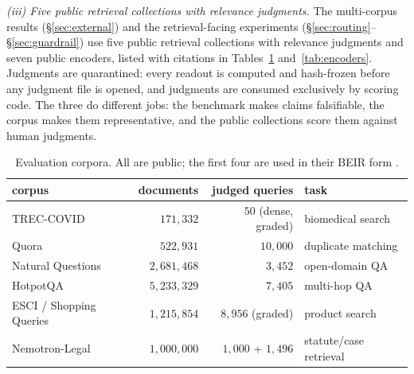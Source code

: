\documentclass[11pt,letterpaper]{article}
\begin{document}
\emph{(iii) Five public retrieval collections with relevance
judgments.} The multi-corpus results (\S\ref{sec:external}) and the
retrieval-facing experiments
(\S\ref{sec:routing}--\S\ref{sec:guardrail}) use five public retrieval
collections with relevance judgments and seven public encoders, listed
with citations in Tables~\ref{tab:corpora} and~\ref{tab:encoders}.
Judgments are quarantined: every readout is computed and hash-frozen
before any judgment file is opened, and judgments are consumed exclusively
by scoring code. The three do different jobs: the benchmark makes claims falsifiable,
the corpus makes them representative, and the public collections score
them against human judgments.

\begin{table}[t]
\centering
\caption{Evaluation corpora. All are public; the first four are used in
their BEIR form \cite{thakur2021}.}
\label{tab:corpora}
\small
\begin{tabular}{lrrl}
\toprule
corpus & documents & judged queries & task\\
\midrule
TREC-COVID \cite{voorhees2020} & $171{,}332$ & $50$ (dense, graded) & biomedical search\\
Quora \cite{iyer2017} & $522{,}931$ & $10{,}000$ & duplicate matching\\
Natural Questions \cite{kwiatkowski2019} & $2{,}681{,}468$ & $3{,}452$ & open-domain QA\\
HotpotQA \cite{yang2018} & $5{,}233{,}329$ & $7{,}405$ & multi-hop QA\\
ESCI / Shopping Queries \cite{reddy2022} & $1{,}215{,}854$ & $8{,}956$ (graded) & product search\\
Nemotron-Legal \cite{nemotronlegal} & $1{,}000{,}000$ & $1{,}000$ + $1{,}496$ & statute/case retrieval\\
\bottomrule
\end{tabular}
\end{table}
\end{document}
